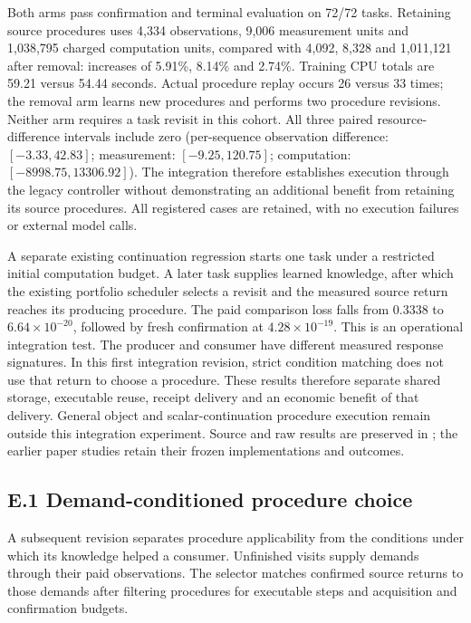 \documentclass[11pt,a4paper]{article}
\begin{document}
Both arms pass confirmation and terminal evaluation on 72/72 tasks. Retaining
source procedures uses 4,334 observations, 9,006 measurement units and 1,038,795
charged computation units, compared with 4,092, 8,328 and 1,011,121 after removal:
increases of 5.91\%, 8.14\% and 2.74\%. Training CPU totals are 59.21 versus 54.44
seconds. Actual procedure replay occurs 26 versus 33 times; the removal arm
learns new procedures and performs two procedure revisions. Neither arm requires
a task revisit in this cohort. All three paired resource-difference intervals
include zero (per-sequence observation difference: \([-3.33,42.83]\); measurement:
\([-9.25,120.75]\); computation: \([-8998.75,13306.92]\)). The integration therefore
establishes execution through the legacy controller without demonstrating an
additional benefit from retaining its source procedures. All registered cases
are retained, with no execution failures or external model calls.


A separate existing continuation regression starts one task under a restricted
initial computation budget. A later task supplies learned knowledge, after which
the existing portfolio scheduler selects a revisit and the measured source return
reaches its producing procedure. The paid comparison loss falls from 0.3338 to
\(6.64\times10^{-20}\), followed by fresh confirmation at
\(4.28\times10^{-19}\). This is an operational integration test. The
producer and consumer have different measured response signatures. In this first
integration revision, strict condition matching does not use that return to choose
a procedure. These
results therefore separate shared storage, executable reuse, receipt delivery and
an economic benefit of that delivery. General object and scalar-continuation
procedure execution remain outside this integration experiment. Source and raw
results are preserved in ; the earlier
paper studies retain their frozen implementations and outcomes.


\subsection*{E.1 Demand-conditioned procedure choice}

A subsequent revision separates procedure applicability from the conditions under
which its knowledge helped a consumer. Unfinished visits supply demands through
their paid observations. The selector matches confirmed source returns to those
demands after filtering procedures for executable steps and acquisition and
confirmation budgets.
\end{document}
